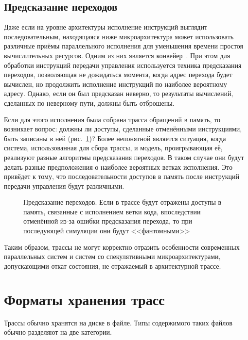 \subsection{Предсказание переходов}

Даже если на уровне архитектуры исполнение инструкций выглядит последовательным, находящаяся ниже микроархитектура может использовать различные приёмы параллельного исполнения для уменьшения времени простоя вычислительных ресурсов. Одним из них является конвейер~\cite[глава 9]{structured-parallel}. При этом для обработки инструкций передачи управления используется техника предсказания переходов, позволяющая не дожидаться момента, когда адрес перехода будет вычислен, но продолжить исполнение инструкций по наиболее вероятному адресу. Однако, если он был предсказан неверно, то результаты вычислений, сделанных по неверному пути, должны быть отброшены. 

Если для этого исполнения была собрана трасса обращений в память, то возникает вопрос: должны ли доступы, сделанные отменёнными инструкциями, быть записаны в ней (рис.~\ref{fig:trace-misspeculation})? 
Более непонятной является ситуация, когда система, использованная для сбора трассы, и модель, проигрывающая её, реализуют разные алгоритмы предсказания переходов. В таком случае они будут делать разные предположения о наиболее вероятных ветках исполнения. Это привёдет к тому, что последовательности доступов в память после инструкций передачи управления будут различными.

\begin{figure}[htp]
    \centering
    \caption[Предсказание переходов]{Предсказание переходов. Если в трассе будут отражены доступы в память, связанные с исполнением ветки кода, впоследствии отменённой из-за ошибки предсказания перехода, то при последующей симуляции они будут <<фантомными>>}
    \label{fig:trace-misspeculation}
\end{figure}

Таким образом, трассы не могут корректно отразить особенности современных параллельных систем и систем со спекулятивными микроархитектурами, допускающими откат состояния, не отражаемый в архитектурной трассе.

\section{Форматы хранения трасс}\label{sec:formats}

Трассы обычно хранятся на диске в файле. Типы содержимого таких файлов обычно разделяют на две категории.


